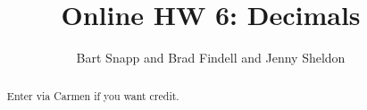 \documentclass[handout,space,nooutcomes]{xourse}
\title{Online HW 6: Decimals}
\author{Bart Snapp and Brad Findell and Jenny Sheldon}
\begin{document}
\begin{abstract}
Enter via Carmen if you want credit.   
\end{abstract}
\maketitle


\end{document}
